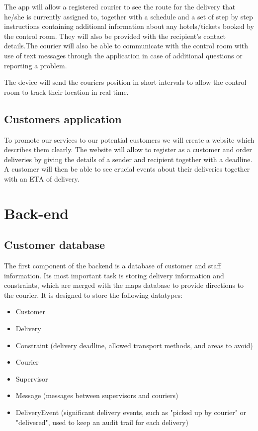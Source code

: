 The app will allow a registered courier to see the route for the delivery that he/she is currently assigned to, together with a schedule and a set of step by step instructions containing additional information about any hotels/tickets booked by the control room. They will also be provided with the recipient's contact details.The courier will also be able to communicate with the control room with use of text messages through the application in case of additional questions or reporting a problem. 

The device will send the couriers position in short intervals to allow the control room to track their location in real time.
\subsection{Customers application} \label{customersarch}
To promote our services to our potential customers we will create a website which describes them clearly. The website will allow to register as a customer and order deliveries by giving the details of a sender and recipient together with a deadline. A customer will then be able to see crucial events about their deliveries together with an ETA of delivery.


\section{Back-end} \label{backendarch}
\subsection{Customer database} \label{databasearch}
The first component of the backend is a database of customer and staff information. Its most important task is storing delivery information and constraints, which are merged with the maps database to provide directions to the courier. It is designed to store the following datatypes:

\begin{itemize}
    \item Customer
    \item Delivery
    \item Constraint (delivery deadline, allowed transport methods, and areas to avoid)
    \item Courier
    \item Supervisor
    \item Message (messages between supervisors and couriers)
    \item DeliveryEvent (significant delivery events, such as "picked up by courier" or "delivered", used to keep an audit trail for each delivery)
\end{itemize}

